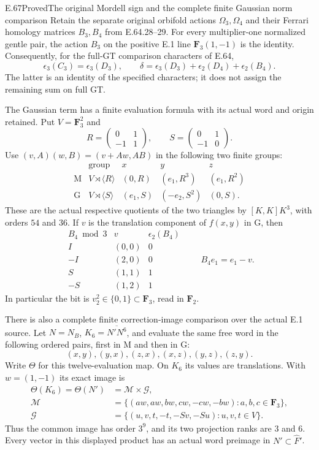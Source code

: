 \begin{statement}{E.67}{Proved}{The original Mordell sign and the complete finite Gaussian norm comparison}
Retain the separate original orbifold actions $\Omega_3,\Omega_4$
and their Ferrari homology matrices $B_3,B_4$ from E.64.28--29.
For every multiplier-one normalized gentle pair, the action $B_3$
on the positive E.1 line $\mathbf F_3(1,-1)$ is the identity.
Consequently, for the full-GT comparison characters of E.64,
\[
 \epsilon_3(C_3)=\epsilon_3(D_3),\qquad
 \delta=\epsilon_3(D_3)+\epsilon_2(D_4)+\epsilon_2(B_4).
 \tag{E.67.1}
\]
The latter is an identity of the specified characters; it does
not assign the remaining sum on full GT.

The Gaussian term has a finite evaluation formula with its
actual word and origin retained. Put $V=\mathbf F_3^2$ and
\[
 R=\begin{pmatrix}0&1\\-1&1\end{pmatrix},\qquad
 S=\begin{pmatrix}0&1\\-1&0\end{pmatrix}.
 \tag{E.67.2}
\]
Use $(v,A)(w,B)=(v+Aw,AB)$ in the following two finite groups:
\[
 \begin{array}{c|c|c|c|c}
 &\text{group}&x&y&z\\ \hline
 \mathrm M&V\rtimes\langle R\rangle&(0,R)&(e_1,R^3)&(e_1,R^2)\\
 \mathrm G&V\rtimes\langle S\rangle&(e_1,S)&(-e_2,S^2)&(0,S).
 \end{array}
 \tag{E.67.3}
\]
These are the actual respective quotients of the two triangles
by $[K,K]K^3$, with orders $54$ and $36$. If $v$ is the
translation component of $f(x,y)$ in $\mathrm G$, then
\[
 \begin{array}{c|c|c}
 B_4\bmod3&v&\epsilon_2(B_4)\\ \hline
 I&(0,0)&0\\
 -I&(2,0)&0\\
 S&(1,1)&1\\
 -S&(1,2)&1
 \end{array}
 \qquad B_4e_1=e_1-v.
 \tag{E.67.4}
\]
In particular the bit is $v_2^2\in\{0,1\}\subset\mathbf F_3$,
read in $\mathbf F_2$.

There is also a complete finite correction-image comparison over
the actual E.1 source. Let $N=N_B$, $K_6=\overline{N'N^6}$,
and evaluate the same free word in the following ordered pairs,
first in $\mathrm M$ and then in $\mathrm G$:
\[
               (x,y),(y,x),(z,x),(x,z),(y,z),(z,y).
 \tag{E.67.5}
\]
Write $\Theta$ for this twelve-evaluation map. On $K_6$ its
values are translations. With $w=(1,-1)$ its exact image is
\[
 \begin{split}
 \Theta(K_6)=\Theta(N')&=\mathcal M\times\mathcal G,\\
 \mathcal M&=\{(aw,aw,bw,cw,-cw,-bw):a,b,c\in\mathbf F_3\},\\
 \mathcal G&=\{(u,v,t,-t,-Sv,-Su):u,v,t\in V\}.
 \end{split}
 \tag{E.67.6}
\]
Thus the common image has order $3^9$, and its two projection
ranks are $3$ and $6$. Every vector in this displayed product
has an actual word preimage in $N'\subset\widehat F'$.


\end{statement}
